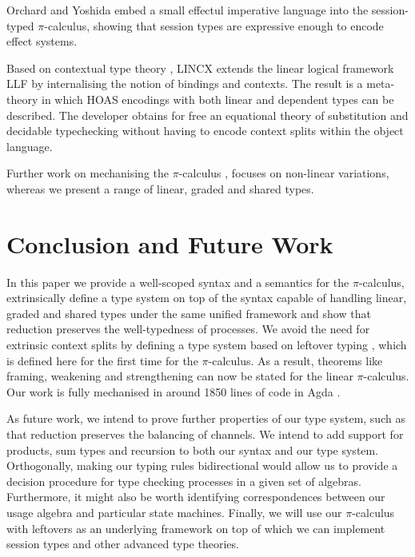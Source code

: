 \documentclass[]{llncs}
\newcommand{\picalc}{$\pi$-calculus}
\begin{document}
Orchard and Yoshida \cite{OrchardY16} embed a small effectul imperative language into the session-typed \picalc{}, showing that session types are expressive enough to encode effect systems.

Based on contextual type theory \cite{Pientkaa,Pientka}, LINCX \cite{Georges2017} extends the linear logical framework LLF \cite{Cervesato1996} by internalising the notion of bindings and contexts.
The result is a meta-theory in which HOAS encodings with both linear and dependent types can be described.
The developer obtains for free an equational theory of substitution and decidable typechecking without having to encode context splits within the object language.

Further work on mechanising the \picalc{} \cite{Henry-Gerard1999,Honsell2001a,Bengtson2013,Despeyroux2000,Affeldt2008}, focuses on non-linear variations, whereas we present a range of linear, graded and shared types.

\section{Conclusion and Future Work}

In this paper we provide a well-scoped syntax and a semantics for the \picalc{}, extrinsically define a type system on top of the syntax capable of handling linear, graded and shared types under the same unified framework and show that reduction preserves the well-typedness of processes.
We avoid the need for extrinsic context splits by defining a type system based on leftover typing \cite{Allais2018a}, which is defined here for the first time for the \picalc{}.
As a result, theorems like framing, weakening and strengthening can now be stated for the linear \picalc{}.
Our work is fully mechanised in around 1850 lines of code in Agda \cite{Zalakain2020Agda}.

As future work, we intend to prove further properties of our type system, such as that reduction preserves the balancing of channels.
We intend to add support for products, sum types and recursion to both our syntax and our type system.
Orthogonally, making our typing rules bidirectional would allow us to provide a decision procedure for type checking processes in a given set of algebras.
Furthermore, it might also be worth identifying correspondences between our usage algebra and particular state machines.
Finally, we will use our \picalc{} with leftovers as an underlying framework on top of which we can implement session types and other advanced type theories.




\appendix

\end{document}
